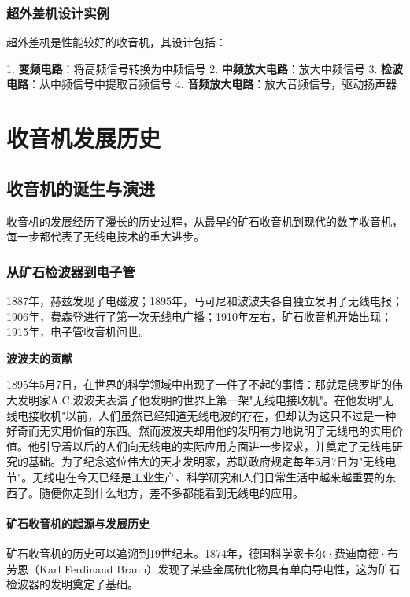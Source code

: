 \documentclass[12pt,UTF8]{ctexbook}
\begin{document}
\section{超外差机设计实例}

超外差机是性能较好的收音机，其设计包括：

1. \textbf{变频电路}：将高频信号转换为中频信号
2. \textbf{中频放大电路}：放大中频信号
3. \textbf{检波电路}：从中频信号中提取音频信号
4. \textbf{音频放大电路}：放大音频信号，驱动扬声器

\part{收音机发展历史}

\chapter{收音机的诞生与演进}

收音机的发展经历了漫长的历史过程，从最早的矿石收音机到现代的数字收音机，每一步都代表了无线电技术的重大进步。

\section{从矿石检波器到电子管}

1887年，赫兹发现了电磁波；1895年，马可尼和波波夫各自独立发明了无线电报；1906年，费森登进行了第一次无线电广播；1910年左右，矿石收音机开始出现；1915年，电子管收音机问世。

\textbf{波波夫的贡献}

1895年5月7日，在世界的科学领域中出现了一件了不起的事情：那就是俄罗斯的伟大发明家A.C.波波夫表演了他发明的世界上第一架"无线电接收机"。在他发明"无线电接收机"以前，人们虽然已经知道无线电波的存在，但却认为这只不过是一种好奇而无实用价值的东西。然而波波夫却用他的发明有力地说明了无线电的实用价值。他引导着以后的人们向无线电的实际应用方面进一步探求，并奠定了无线电研究的基础。为了纪念这位伟大的天才发明家，苏联政府规定每年5月7日为"无线电节"。无线电在今天已经是工业生产、科学研究和人们日常生活中越来越重要的东西了。随便你走到什么地方，差不多都能看到无线电的应用。

\subsection{矿石收音机的起源与发展历史}

矿石收音机的历史可以追溯到19世纪末。1874年，德国科学家卡尔·费迪南德·布劳恩（Karl Ferdinand Braun）发现了某些金属硫化物具有单向导电性，这为矿石检波器的发明奠定了基础。
\end{document}
